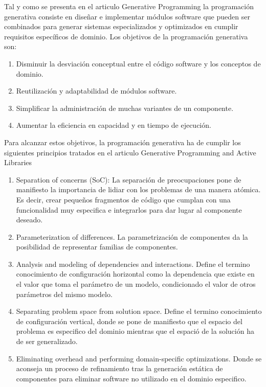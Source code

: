\documentclass[a4paper,11pt]{book}
\begin{document}
Tal y como se presenta en el articulo Generative Programming\cite{gp} la programación generativa consiste en diseñar e implementar módulos software que pueden ser combinados para generar sistemas especializados y  optimizados en cumplir requisitos específicos de dominio. Los objetivos de la programación generativa son:

\begin{enumerate}
\item Disminuir la desviación conceptual entre el código software y los conceptos de dominio.
\item Reutilización y adaptabilidad de módulos software.
\item Simplificar la administración de muchas variantes de un componente.
\item Aumentar la eficiencia  en capacidad y en tiempo de ejecución.
\end{enumerate}


Para alcanzar estos objetivos, la programación generativa ha de cumplir los siguientes principios tratados en el articulo Generative Programming and Active Libraries \cite{gpl}

\begin{enumerate}
\item Separation of concerns (SoC): La separación de preocupaciones pone de manifiesto la importancia de lidiar con los problemas de una manera atómica. Es decir, crear pequeños fragmentos de código que cumplan con una funcionalidad muy especifica e integrarlos para dar lugar al componente deseado.
\item Parameterization of differences. La parametrización de componentes da la posibilidad de representar familias de componentes.
\item Analysis and modeling of dependencies and interactions. Define el termino conocimiento de configuración horizontal como la dependencia que existe en el valor que toma el parámetro de un modelo, condicionado el valor de otros parámetros del mismo modelo.
\item Separating problem space from solution space. Define el termino conocimiento de configuración vertical, donde se pone de manifiesto que el espacio del problema es especifico del dominio mientras que el espació de la solución ha de ser generalizado.
\item Eliminating overhead and performing domain-specific optimizations. Donde se aconseja un proceso de refinamiento tras la generación estática de componentes para eliminar software no utilizado en el dominio especifico.
\end{enumerate}
\end{document}
